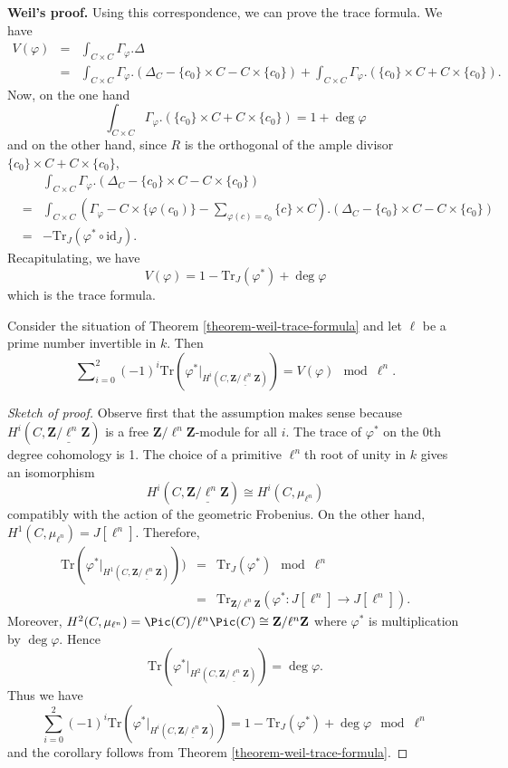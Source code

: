 \medskip\noindent
{\bf Weil's proof.} Using this correspondence, we can prove the trace
formula. We have
\begin{eqnarray*}
V(\varphi) & = & \int_{C \times C} \Gamma_\varphi.\Delta \\
& = & \int_{C \times C} \Gamma_\varphi. \left(\Delta_C - \{c_0\} \times C - C
\times \{c_0\}\right) + \int_{C \times C} \Gamma_\varphi. \left(\{c_0\} \times C
+ C \times \{c_0\}\right).
\end{eqnarray*}
Now, on the one hand
$$
\int_{C \times C} \Gamma_\varphi. \left(\{c_0\} \times C + C \times
\{c_0\}\right)
=
1 + \deg \varphi
$$
and on the other hand, since $R$ is the orthogonal of the ample divisor
$\{c_0\} \times C + C \times \{c_0\}$,
\begin{eqnarray*}
& &
\int_{C \times C} \Gamma_\varphi. \left(\Delta_C - \{c_0\} \times C - C \times
\{c_0\}\right) \\
& = &
\int_{C \times C} \left(\Gamma_\varphi - C \times \{\varphi(c_0)\} -
\sum_{\varphi(c) = c_0} \{c\} \times C \right). \left(\Delta_C - \{c_0\} \times
C - C \times \{c_0\}\right) \\
& = & - \text{Tr}_J (\varphi^* \circ \text{id}_J).
\end{eqnarray*}
Recapitulating, we have
$$
V(\varphi) = 1 - \text{Tr}_J (\varphi^*) + \deg \varphi
$$
which is the trace formula.

\begin{lemma}
\label{lemma-weil-mod}
Consider the situation of
Theorem \ref{theorem-weil-trace-formula}
and let $\ell$ be a prime number invertible in $k$. Then
$$
\sum\nolimits_{i = 0}^2
(-1)^i
\text{Tr}(\varphi^* |_{H^i (C, \underline{\mathbf{Z}/\ell^n \mathbf{Z}})})
=
V(\varphi) \mod \ell^n.
$$
\end{lemma}

\begin{proof}[Sketch of proof]
Observe first that the assumption makes sense because $H^i(C,
\underline{\mathbf{Z}/\ell^n \mathbf{Z}})$ is a free $\mathbf{Z}/\ell^n
\mathbf{Z}$-module for all $i$. The trace of $\varphi^*$ on the 0th degree
cohomology is 1. The choice of a primitive $\ell^n$th root of unity in $k$
gives an isomorphism
$$
H^i(C, \underline{\mathbf{Z}/\ell^n \mathbf{Z}}) \cong H^i(C, \mu_{\ell^n})
$$
compatibly with the action of the geometric Frobenius. On the other hand,
$H^1(C, \mu_{\ell^n}) = J[\ell^n]$. Therefore,
\begin{eqnarray*}
\text{Tr}(\varphi^* |_{H^1 (C, \underline{\mathbf{Z}/\ell^n \mathbf{Z}})})) & =
& \text{Tr}_J (\varphi^*) \mod \ell^n \\
& = & \text{Tr}_{\mathbf{Z}/\ell^n \mathbf{Z}} (\varphi^* : J[\ell^n] \to
J[\ell^n]).
\end{eqnarray*}
Moreover, $H^2(C, \mu_{\ell^n}) = \Pic(C)/\ell^n\Pic(C) \cong
\mathbf{Z}/\ell^n \mathbf{Z}$ where $\varphi^*$ is multiplication by $\deg
\varphi$. Hence
$$
\text{Tr} (\varphi^*|_{H^2 (C, \underline{\mathbf{Z}/\ell^n \mathbf{Z}})}) =
\deg \varphi.
$$
Thus we have
$$
\sum_{i = 0}^2 (-1)^i
\text{Tr}(\varphi^* |_{H^i (C, \underline{\mathbf{Z}/\ell^n \mathbf{Z}})}) =
1 - \text{Tr}_J(\varphi^*) + \deg \varphi \mod \ell^n
$$
and the corollary follows from Theorem \ref{theorem-weil-trace-formula}.
\end{proof}

